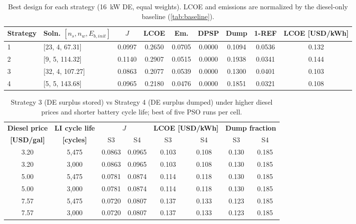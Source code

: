 \documentclass[final,3p,times]{elsarticle}
\begin{document}
\begin{table}[htbp]
\centering
\small
\begin{tabular}{l l c c c c c c c}
\toprule
\textbf{Strategy} & \textbf{Soln. $[n_s, n_w, E_{b,init}]$} & \textbf{$J$} & \textbf{LCOE} & \textbf{Em.} & \textbf{DPSP} & \textbf{Dump} & \textbf{1-REF} & \textbf{LCOE [USD/kWh]} \\
\midrule
1 & [23, 4, 67.31] & 0.0997 & 0.2650 & 0.0705 & 0.0000 & 0.1094 & 0.0536 & 0.132 \\
2 & [9, 5, 114.32] & 0.1140 & 0.2907 & 0.0515 & 0.0000 & 0.1938 & 0.0341 & 0.144 \\
3 & [32, 4, 107.27] & 0.0863 & 0.2077 & 0.0539 & 0.0000 & 0.1300 & 0.0401 & 0.103 \\
4 & [5, 5, 143.68] & 0.0965 & 0.2180 & 0.0476 & 0.0000 & 0.1851 & 0.0321 & 0.108 \\
\bottomrule
\end{tabular}
\caption{\label{tab:strat} Best design for each strategy (16~kW DE, equal weights). LCOE and emissions are normalized by the diesel-only baseline (\cref{tab:baseline}).}
\end{table}

\begin{table}[htbp]
\centering
\small
\begin{tabular}{c c c c c c c c}
\toprule
\textbf{Diesel price} & \textbf{LI cycle life} & \multicolumn{2}{c}{\textbf{$J$}} & \multicolumn{2}{c}{\textbf{LCOE [USD/kWh]}} & \multicolumn{2}{c}{\textbf{Dump fraction}} \\
\textbf{[USD/gal]} & \textbf{[cycles]} & S3 & S4 & S3 & S4 & S3 & S4 \\
\midrule
3.20 & 5,475 & 0.0863 & 0.0965 & 0.103 & 0.108 & 0.130 & 0.185 \\
3.20 & 3,000 & 0.0863 & 0.0965 & 0.103 & 0.108 & 0.130 & 0.185 \\
5.00 & 5,475 & 0.0781 & 0.0874 & 0.114 & 0.118 & 0.130 & 0.185 \\
5.00 & 3,000 & 0.0781 & 0.0874 & 0.114 & 0.118 & 0.130 & 0.185 \\
7.57 & 5,475 & 0.0720 & 0.0807 & 0.137 & 0.133 & 0.123 & 0.185 \\
7.57 & 3,000 & 0.0720 & 0.0807 & 0.137 & 0.133 & 0.123 & 0.185 \\
\bottomrule
\end{tabular}
\caption{\label{tab:strategy_stress} Strategy 3 (DE surplus stored) vs Strategy 4 (DE surplus dumped) under higher diesel prices and shorter battery cycle life; best of five PSO runs per cell.}
\end{table}
\end{document}
